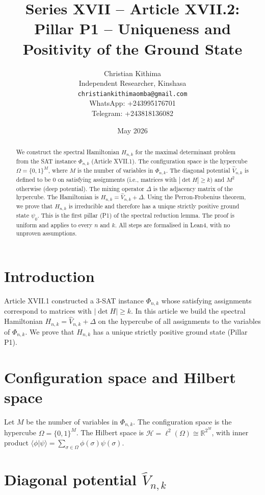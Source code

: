 \documentclass[11pt,a4paper]{article}
\title{Series XVII – Article XVII.2: Pillar P1 – Uniqueness and Positivity of the Ground State}
\author{Christian Kithima \\
Independent Researcher, Kinshasa \\
\texttt{christiankithimaomba@gmail.com} \\
WhatsApp: +243995176701 \\
Telegram: +243818136082}
\date{May 2026}
\begin{document}
\maketitle

\begin{abstract}
We construct the spectral Hamiltonian $H_{n,k}$ for the maximal determinant problem from the SAT instance $\Phi_{n,k}$ (Article XVII.1). The configuration space is the hypercube $\Omega = \{0,1\}^M$, where $M$ is the number of variables in $\Phi_{n,k}$. The diagonal potential $\hat{V}_{n,k}$ is defined to be $0$ on satisfying assignments (i.e., matrices with $|\det H| \ge k$) and $M^2$ otherwise (deep potential). The mixing operator $\Delta$ is the adjacency matrix of the hypercube. The Hamiltonian is $H_{n,k} = \hat{V}_{n,k} + \Delta$. Using the Perron‑Frobenius theorem, we prove that $H_{n,k}$ is irreducible and therefore has a unique strictly positive ground state $\psi_0$. This is the first pillar (P1) of the spectral reduction lemma. The proof is uniform and applies to every $n$ and $k$. All steps are formalised in Lean4, with no unproven assumptions.
\end{abstract}

\tableofcontents

\section{Introduction}

Article XVII.1 constructed a 3‑SAT instance $\Phi_{n,k}$ whose satisfying assignments correspond to matrices with $|\det H| \ge k$. In this article we build the spectral Hamiltonian $H_{n,k} = \hat{V}_{n,k} + \Delta$ on the hypercube of all assignments to the variables of $\Phi_{n,k}$. We prove that $H_{n,k}$ has a unique strictly positive ground state (Pillar P1).

\section{Configuration space and Hilbert space}

Let $M$ be the number of variables in $\Phi_{n,k}$. The configuration space is the hypercube $\Omega = \{0,1\}^M$. The Hilbert space is $\mathcal{H} = \ell^2(\Omega) \cong \mathbb{R}^{2^M}$, with inner product $\langle \phi | \psi \rangle = \sum_{\sigma\in\Omega} \phi(\sigma)\psi(\sigma)$.

\section{Diagonal potential $\hat{V}_{n,k}$}
\end{document}
